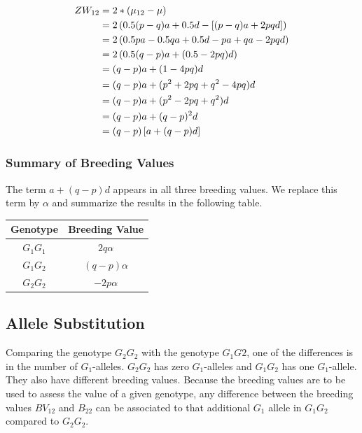 \documentclass[
]{book}
\theoremstyle{definition}
\theoremstyle{definition}
\theoremstyle{definition}
\theoremstyle{remark}
\begin{document}
\begin{align}
ZW_{12} &=   2*(\mu_{12} - \mu) \notag \\
        &=   2\left(0.5(p-q)a + 0.5d - \left[(p - q)a + 2pqd \right] \right) \notag \\
        &=   2\left(0.5pa - 0.5qa + 0.5d - pa + qa - 2pqd \right) \notag \\
        &=   2\left(0.5(q-p)a + (0.5 - 2pq)d \right) \notag \\
        &=   (q-p)a + (1-4pq)d  \notag \\
        &=   (q-p)a + (p^2 + 2pq + q^2 -4pq)d  \notag \\
        &=   (q-p)a + (p^2 - 2pq + q^2)d  \notag \\
        &=   (q-p)a + (q - p)^2d   \notag \\
        &=   (q-p)\left[a + (q-p)d \right]
\label{eq:BVGen12}
\end{align}

\hypertarget{summary-of-breeding-values}{%
\subsubsection{Summary of Breeding Values}\label{summary-of-breeding-values}}

The term \(a + (q-p)d\) appears in all three breeding values. We replace this term by \(\alpha\) and summarize the results in the following table.

\begin{tabular}{|c|c|}
  \hline
  Genotype  &  Breeding Value\\
  \hline
  $G_1G_1$  &  $2q\alpha$    \\
  \hline
  $G_1G_2$  &  $(q-p)\alpha$ \\
  \hline
  $G_2G_2$  &  $-2p\alpha$   \\
  \hline
  \end{tabular}

\hypertarget{allele-substitution}{%
\subsection{Allele Substitution}\label{allele-substitution}}

Comparing the genotype \(G_2G_2\) with the genotype \(G_1G2\), one of the differences is in the number of \(G_1\)-alleles. \(G_2G_2\) has zero \(G_1\)-alleles and \(G_1G_2\) has one \(G_1\)-allele. They also have different breeding values. Because the breeding values are to be used to assess the value of a given genotype, any difference between the breeding values \(BV_{12}\) and \(B_{22}\) can be associated to that additional \(G_1\) allele in \(G_1G_2\) compared to \(G_2G_2\).
\end{document}
